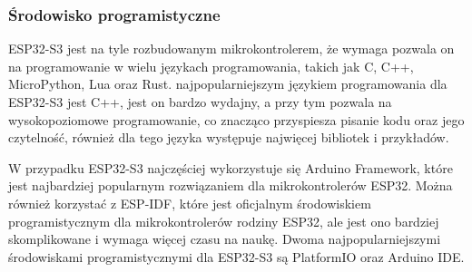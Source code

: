 \documentclass[../main.tex]{subfiles}
\begin{document}
\subsubsection{Środowisko programistyczne}
\label{sec:srodowisko_programistyczne}
ESP32-S3 jest na tyle rozbudowanym mikrokontrolerem, że wymaga pozwala on na programowanie w wielu językach programowania, takich jak C, C++, MicroPython, Lua oraz Rust.
najpopularniejszym językiem programowania dla ESP32-S3 jest C++, jest on bardzo wydajny, a przy tym pozwala na wysokopoziomowe programowanie, 
co znacząco przyspiesza pisanie kodu oraz jego czytelność, również dla tego języka występuje najwięcej bibliotek i przykładów.

W przypadku ESP32-S3 najczęściej wykorzystuje się Arduino Framework, które jest najbardziej popularnym rozwiązaniem dla mikrokontrolerów ESP32. Można również korzystać z ESP-IDF,
które jest oficjalnym środowiskiem programistycznym dla mikrokontrolerów rodziny ESP32, ale jest ono bardziej skomplikowane i wymaga więcej czasu na naukę. Dwoma
najpopularniejszymi środowiskami programistycznymi dla ESP32-S3 są PlatformIO oraz Arduino IDE.
\end{document}
